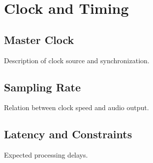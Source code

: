 \section{Clock and Timing}
\subsection{Master Clock}
Description of clock source and synchronization.
\subsection{Sampling Rate}
Relation between clock speed and audio output.
\subsection{Latency and Constraints}
Expected processing delays.